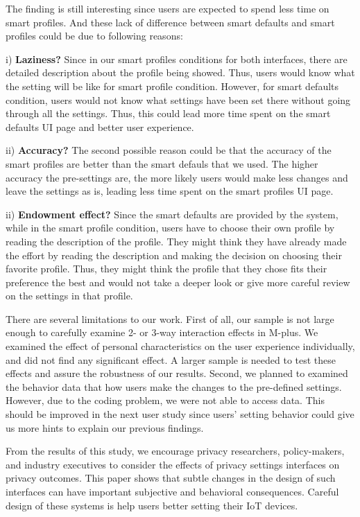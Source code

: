 The finding is still interesting since users are expected to spend less time on smart profiles. And these lack of difference between smart defaults and smart profiles could be due to following reasons:

i) \textbf{Laziness?} Since in our smart profiles conditions for both interfaces, there are detailed description about the profile being showed. Thus, users would know what the setting will be like for smart profile condition. However, for smart defaults condition, users would not know what settings have been set there without going through all the settings. Thus, this could lead more time spent on the smart defaults UI page and better user experience.

ii) \textbf{Accuracy?} The second possible reason could be that the accuracy of the smart profiles are better than the smart defauls that we used. The higher accuracy the pre-settings are, the more likely users would make less changes and leave the settings as is, leading less time spent on the smart profiles UI page.

ii) \textbf{Endowment effect?} Since the smart defaults are provided by the system, while in the smart profile condition, users have to choose their own profile by reading the description of the profile. They might think they have already made the effort by reading the description and making the decision on choosing their favorite profile. Thus, they might think the profile that they chose fits their preference the best and would not take a deeper look or give more careful review on the settings in that profile.

There are several limitations to our work. First of all, our sample is not large enough to carefully examine 2- or 3-way interaction effects in M-plus. We examined the effect of personal characteristics on the user experience individually, and did not find any significant effect. A larger sample is needed to test these effects and assure the robustness of our results. Second, we planned to examined the behavior data that how users make the changes to the pre-defined settings. However, due to the coding problem, we were not able to access data. This should be improved in the next user study since users' setting behavior could give us more hints to explain our previous findings.

From the results of this study, we encourage privacy researchers, policy-makers, and industry executives to consider the effects of privacy settings interfaces on privacy outcomes. This paper shows that subtle changes in the design of such interfaces can have important subjective and behavioral consequences. Careful design of these systems is help users better setting their IoT devices.
